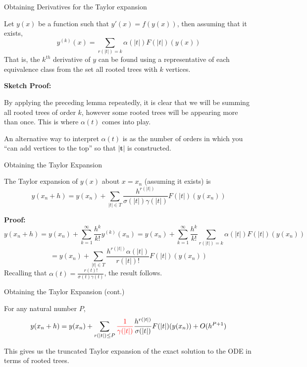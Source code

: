 \documentclass{beamer}
\def \red{\textcolor{red}}
\begin{document}
\begin{frame}{Obtaining Derivatives for the Taylor expansion}
\begin{theorem}
Let $y(x)$ be a function such that $y'(x) = f(y(x))$, then assuming that it exists,
$$y^{(k)}(x) = \sum_{r(|t|) = k}{\alpha(|t|)F(|t|)(y(x))}$$
That is, the $k^{th}$ derivative of $y$ can be found using a representative of each equivalence class from
the set all rooted trees with $k$ vertices.
\end{theorem}
\pause
\textbf{Sketch Proof:}

By applying the preceding lemma repeatedly, it is clear that we will be summing all rooted trees of order $k$, 
however some rooted trees will be appearing more than once. This is where $\alpha(t)$ comes into play. \newline

An alternative way to interpret $\alpha(t)$ is as the number of orders in which you ``can add vertices 
to the top'' so that $|\mathbf{t}|$ is constructed.
\end{frame}

\begin{frame}{Obtaining the Taylor Expansion}
\begin{theorem}
The Taylor expansion of $y(x)$ about $x = x_n$ (assuming it exists) is
$$y(x_n + h) = y(x_n) + \sum_{|t| \in T}{\frac{h^{r(|t|)}}{\sigma(|t|)\gamma(|t|)}F(|t|)(y(x_n))}$$ 
\end{theorem}
\pause
\textbf{Proof:}
$$y(x_n + h) = y(x_n) + \sum_{k = 1}^{\infty}{\frac{h^k}{k!}y^{(k)}(x_n)} = 
 y(x_n) + \sum_{k = 1}^{\infty}{\frac{h^k}{k!} \sum_{r(|t|) = k}{\alpha(|t|)F(|t|)(y(x_n))}}$$
 $$= y(x_n) + \sum_{|t| \in T}{\frac{h^{r(|t|)}\alpha(|t|)}{r(|t|)!}F(|t|)(y(x_n))}$$
 Recalling that $\alpha(t) = \frac{r(t)!}{\sigma(t)\gamma(t)}$, the result follows.
\end{frame}

\begin{frame}{Obtaining the Taylor Expansion (cont.)}
\begin{corollary}
For any natural number $P$, 
$$y(x_n + h) = y(x_n) + \sum_{r(|t|) \le P}{\red{\frac{1}{\gamma(|t|)}}
\frac{h^{r(|t|)}}{\sigma(|t|)}F(|t|)(y(x_n))} + O(h^{P+1})$$
\end{corollary}
This gives us the truncated Taylor expansion of the exact solution to the ODE in terms of rooted trees.
\end{frame}
\end{document}
